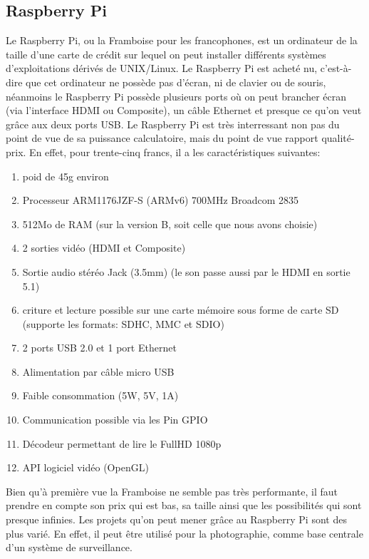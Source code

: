 \documentclass[a4paper,12pt]{report}
\begin{document}
{\subsection{Raspberry Pi}
Le Raspberry Pi\cite{RaspberryPiCaracteristiques}, ou la Framboise pour les francophones, est un ordinateur de la taille d'une carte de crédit sur lequel on peut installer différents systèmes d'exploitations dérivés de UNIX/Linux. Le Raspberry Pi est acheté nu, c'est-à-dire que cet ordinateur ne possède pas d'écran, ni de clavier ou de souris, néanmoins le Raspberry Pi possède plusieurs ports où on peut brancher écran (via l'interface HDMI ou Composite), un câble Ethernet et presque ce qu'on veut grâce aux deux ports USB. Le Raspberry Pi est très interressant non pas du point de vue de sa puissance calculatoire, mais du point de vue rapport qualité-prix. En effet, pour trente-cinq francs, il a les caractéristiques suivantes: 
\begin{enumerate}
\item poid de 45g environ
\item Processeur ARM1176JZF-S (ARMv6) 700MHz Broadcom 2835
\item 512Mo de RAM (sur la version B, soit celle que nous avons choisie)
\item 2 sorties vidéo (HDMI et Composite) 
\item Sortie audio stéréo Jack (3.5mm) (le son passe aussi par le HDMI en sortie 5.1)
\item criture et lecture possible sur une carte mémoire sous forme de carte SD (supporte les formats: SDHC, MMC et SDIO)
\item 2 ports USB 2.0 et 1 port Ethernet
\item Alimentation par câble micro USB
\item Faible consommation (5W, 5V, 1A)
\item Communication possible via les Pin GPIO
\item Décodeur permettant de lire le FullHD  1080p
\item API logiciel vidéo (OpenGL)
\end{enumerate}
Bien qu'à première vue la Framboise ne semble pas très performante, il faut prendre en compte son prix qui est bas, sa taille ainsi que les possibilités qui sont presque infinies. Les projets qu'on peut mener grâce au Raspberry Pi sont des plus varié. En effet, il peut être utilisé pour la photographie, comme base centrale d'un système de surveillance. 

}
\end{document}
